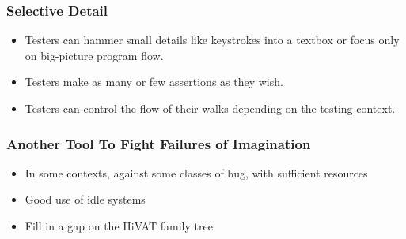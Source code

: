 \begin{frame}
  \frametitle{Selective Detail}
  \begin{itemize}
    \item Testers can hammer small details like keystrokes into a textbox or focus only on big-picture program flow.
    \item Testers make as many or few assertions as they wish.
    \item Testers can control the flow of their walks depending on the testing context.
  \end{itemize}
\end{frame}

\begin{frame}
  \frametitle{Another Tool To Fight Failures of Imagination}
  \begin{itemize}
    \item In some contexts, against some classes of bug, with sufficient resources
    \item Good use of idle systems
    \item Fill in a gap on the HiVAT family tree
  \end{itemize}
\end{frame}
